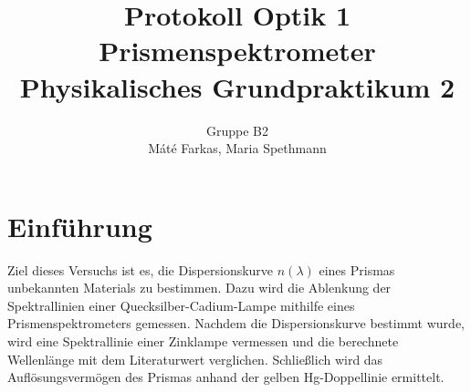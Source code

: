\documentclass[12pt,a4paper]{article}
\author{Gruppe B2 \\ Máté Farkas, Maria Spethmann}
\title{Protokoll Optik 1 \\ Prismenspektrometer \\ Physikalisches Grundpraktikum 2}
\begin{document}
	\maketitle
	\thispagestyle{empty} %
	\newpage
	\pagestyle{headings} %
	\tableofcontents
	\newpage

\section{Einführung}
Ziel dieses Versuchs ist es, die Dispersionskurve $n(\lambda)$ eines Prismas unbekannten Materials zu bestimmen. Dazu wird die Ablenkung der Spektrallinien einer Quecksilber-Cadium-Lampe mithilfe eines Prismenspektrometers gemessen. Nachdem die Dispersionskurve bestimmt wurde, wird eine Spektrallinie einer Zinklampe vermessen und die berechnete Wellenlänge mit dem Literaturwert verglichen. Schließlich wird das Auflösungsvermögen des Prismas anhand der gelben Hg-Doppellinie ermittelt.
\end{document}
